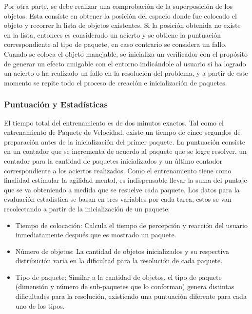 \documentclass[conference]{IEEEtran}
\begin{document}
Por otra parte, se debe realizar una comprobación de la superposición de los objetos. Esta consiste en obtener la posición del espacio donde fue colocado el objeto y recorrer la lista de objetos existentes. Si la posición obtenida no existe en la lista, entonces es considerado un acierto y se obtiene la puntuación correspondiente al tipo de paquete, en caso contrario se considera un fallo. Cuando se coloca el objeto manejable, se inicializa un verificador con el propósito de generar un efecto amigable con el entorno indicándole al usuario si ha logrado un acierto o ha realizado un fallo en la resolución del problema, y a partir de este momento se repite todo el proceso de creación e inicialización de paquetes.

\subsubsection*{Puntuación y Estadísticas}

El tiempo total del entrenamiento es de dos minutos exactos. Tal como el entrenamiento de Paquete de Velocidad, existe un tiempo de cinco segundos de preparación antes de la inicialización del primer paquete. La puntuación consiste en un contador que se incrementa de acuerdo al paquete que se logre resolver, un contador para la cantidad de paquetes inicializados y un último contador correspondiente a los aciertos realizados. Como el entrenamiento tiene como finalidad estimular la agilidad mental, es indispensable llevar la suma del puntaje que se va obteniendo a medida que se resuelve cada paquete.
Los datos para la evaluación estadística se basan en tres variables por cada tarea, estos se van recolectando a partir de la inicialización de un paquete:

\begin{itemize}
\item Tiempo de colocación: Calcula el tiempo de percepción y reacción del usuario inmediatamente después que es mostrado un paquete.
\item Número de objetos: La cantidad de objetos inicializados y su respectiva distribución varía en la dificultad para la resolución de cada paquete.
\item Tipo de paquete: Similar a la cantidad de objetos, el tipo de paquete (dimensión y número de sub-paquetes que lo conforman) genera distintas dificultades para la resolución, existiendo una puntuación diferente para cada uno de los tipos.
\end{itemize}
\end{document}
